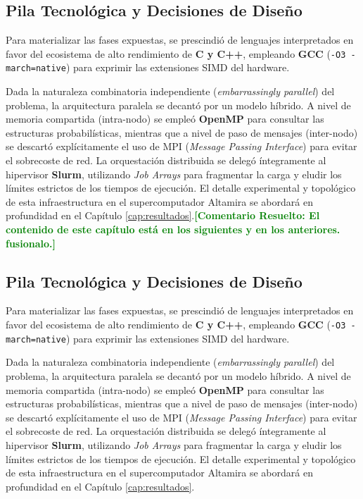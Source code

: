 \documentclass[12pt,a4paper]{tfg_domingo}
\newcommand{\ComentarioR}[1]{\textcolor{green}{\textbf{[Comentario Resuelto:
#1]}}}
\begin{document}
\subsection{Pila Tecnológica y Decisiones de Diseño}
Para materializar las fases expuestas, se prescindió de lenguajes interpretados en favor del ecosistema de alto rendimiento de \textbf{C y C++}, empleando \textbf{GCC} (\texttt{-O3 -march=native}) para exprimir las extensiones SIMD del hardware. 

Dada la naturaleza combinatoria independiente (\emph{embarrassingly parallel}) del problema, la arquitectura paralela se decantó por un modelo híbrido. A nivel de memoria compartida (intra-nodo) se empleó \textbf{OpenMP} para consultar las estructuras probabilísticas, mientras que a nivel de paso de mensajes (inter-nodo) se descartó explícitamente el uso de MPI (\emph{Message Passing Interface}) para evitar el sobrecoste de red. La orquestación distribuida se delegó íntegramente al hipervisor \textbf{Slurm}, utilizando \emph{Job Arrays} para fragmentar la carga y eludir los límites estrictos de los tiempos de ejecución. El detalle experimental y topológico de esta infraestructura en el supercomputador Altamira se abordará en profundidad en el Capítulo \ref{cap:resultados}.\ComentarioR{El contenido de este capítulo está en los siguientes y en los anteriores. fusionalo.}
\subsection{Pila Tecnológica y Decisiones de Diseño}
Para materializar las fases expuestas, se prescindió de lenguajes interpretados en favor del ecosistema de alto rendimiento de \textbf{C y C++}, empleando \textbf{GCC} (\texttt{-O3 -march=native}) para exprimir las extensiones SIMD del hardware. 

Dada la naturaleza combinatoria independiente (\emph{embarrassingly parallel}) del problema, la arquitectura paralela se decantó por un modelo híbrido. A nivel de memoria compartida (intra-nodo) se empleó \textbf{OpenMP} para consultar las estructuras probabilísticas, mientras que a nivel de paso de mensajes (inter-nodo) se descartó explícitamente el uso de MPI (\emph{Message Passing Interface}) para evitar el sobrecoste de red. La orquestación distribuida se delegó íntegramente al hipervisor \textbf{Slurm}, utilizando \emph{Job Arrays} para fragmentar la carga y eludir los límites estrictos de los tiempos de ejecución. El detalle experimental y topológico de esta infraestructura en el supercomputador Altamira se abordará en profundidad en el Capítulo \ref{cap:resultados}.
\end{document}

